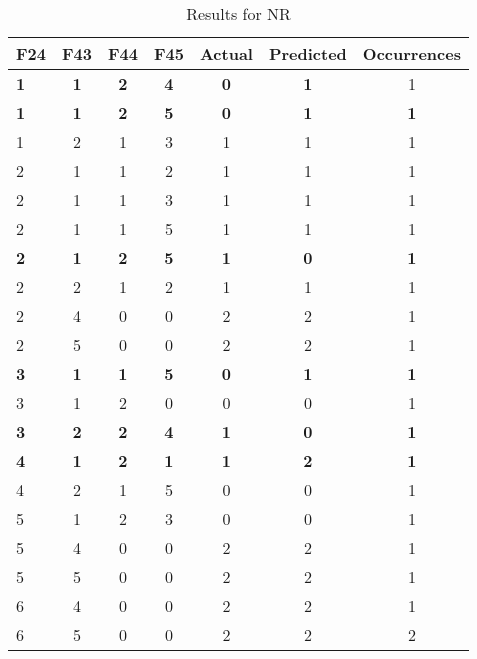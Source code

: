 \begin{table}[htbp]
\centering
\begin{tabular}{|l|c|c|c|c|c|c|}
\hline
F24 & F43 & F44 & F45 & Actual & Predicted & Occurrences \\
\hline
\textbf{1} & \textbf{1} & \textbf{2} & \textbf{4} & \textbf{0} & \textbf{1} & 1 \\
\textbf{1} & \textbf{1}& \textbf{2} & \textbf{5} & \textbf{0} & \textbf{1} & \textbf{1} \\
1 & 2 & 1 & 3 & 1 & 1 & 1 \\
2 & 1 & 1 & 2 & 1 & 1 & 1 \\
2 & 1 & 1 & 3 & 1 & 1 & 1 \\
2 & 1 & 1 & 5 & 1 & 1 & 1 \\
\textbf{2} & \textbf{1} & \textbf{2} & \textbf{5} & \textbf{1} & \textbf{0} & \textbf{1} \\
2 & 2 & 1 & 2 & 1 & 1 & 1 \\
2 & 4 & 0 & 0 & 2 & 2 & 1 \\
2 & 5 & 0 & 0 & 2 & 2 & 1 \\
\textbf{3} & \textbf{1} & \textbf{1} & \textbf{5} & \textbf{0} & \textbf{1} & \textbf{1} \\
3 & 1 & 2 & 0 & 0 & 0 & 1 \\
\textbf{3} & \textbf{2} & \textbf{2} & \textbf{4} & \textbf{1} & \textbf{0} & \textbf{1} \\
\textbf{4} & \textbf{1} & \textbf{2} & \textbf{1} & \textbf{1} & \textbf{2} & \textbf{1} \\
4 & 2 & 1 & 5 & 0 & 0 & 1 \\
5 & 1 & 2 & 3 & 0 & 0 & 1 \\
5 & 4 & 0 & 0 & 2 & 2 & 1 \\
5 & 5 & 0 & 0 & 2 & 2 & 1 \\
6 & 4 & 0 & 0 & 2 & 2 & 1 \\
6 & 5 & 0 & 0 & 2 & 2 & 2 \\
\hline
\end{tabular}
\caption{Results for NR}
\label{tab_analysis:NR_results}
\end{table}

